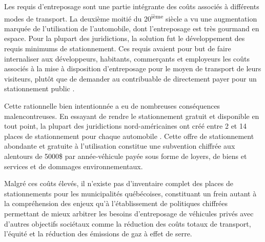 
\label{sec:Introduction}  %

Les requis d'entreposage sont une partie intégrante des coûts associés à différents modes de transport. La deuxième moitié du 20\textsuperscript{ième} siècle a vu une augmentation marquée de l'utilisation de l'automobile, dont l'entreposage est très gourmand en espace. Pour la plupart des juridictions, la solution fut le développement des requis minimums de stationnement. Ces requis avaient pour but de faire internaliser aux développeurs, habitants, commerçants et employeurs les coûts associés à la mise à disposition d'entreposage pour le moyen de transport de leurs visiteurs, plutôt que de demander au contribuable de directement payer pour un stationnement public \parencite{shoup_high_2005}.\par

Cette rationnelle bien intentionnée a eu de nombreuses conséquences malencontreuses. En essayant de rendre le stationnement gratuit et disponible en tout point, la plupart des juridictions nord-américaines ont créé entre 2 et 14 places de stationnement pour chaque automobile \parencite{scharnhorst_quantified_2018}. Cette offre de stationnement abondante et gratuite à l'utilisation constitue une subvention chiffrée aux alentours de 5000\$ par année-véhicule \parencite{litman_comprehensive_2023} payée sous forme de loyers,  de biens et services et de dommages environnementaux.\par

Malgré ces coûts élevés, il n'existe pas d'inventaire complet des places de stationnements pour les municipalités québécoises, constituant un frein autant à la compréhension des enjeux qu'à l'établissement de politiques chiffrées permettant de mieux arbitrer les besoins d'entreposage de véhicules privés avec d'autres objectifs sociétaux comme la réduction des coûts totaux de transport, l'équité et la réduction des émissions de gaz à effet de serre. \par



